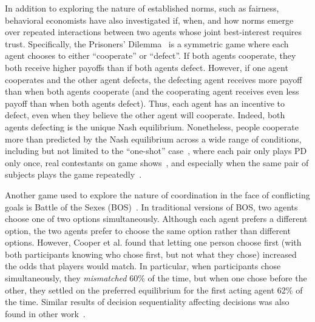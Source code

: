 In addition to exploring the nature of established norms, such as
fairness, behavioral economists have also investigated if, when, and
how norms emerge over repeated interactions between two agents whose
joint best-interest requires trust. Specifically, the Prisoners'
Dilemma~\cite{luce57} is a symmetric game where each agent chooses to
either ``cooperate'' or ``defect''. If both agents cooperate, they
both receive higher payoffs than if both agents defect. However, if
one agent cooperates and the other agent defects, the defecting agent
receives more payoff than when both agents cooperate (and the
cooperating agent receives even less payoff than when both agents
defect). Thus, each agent has an incentive to defect, even when they
believe the other agent will cooperate. Indeed, both agents defecting
is the unique Nash equilibrium. Nonetheless, people cooperate more
than predicted by the Nash equilibrium across a wide range of
conditions, including but not limited to the ``one-shot''
case~\cite{rapoport88}, where each pair only plays PD only once, real
contestants on game shows~\cite{list06}, and especially when the same
pair of subjects plays the game repeatedly~\cite{rand13,sally95}.

Another game used to explore the nature of coordination in the face of
conflicting goals is Battle of the Sexes (BOS)~\cite{luce57}. In
traditional versions of BOS, two agents choose one of two options
simultaneously. Although each agent prefers a different option, the
two agents prefer to choose the same option rather than different options.
However, Cooper et al.\cite{cooper94} found that letting
one person choose first (with both participants knowing who
chose first, but not what they chose) increased the odds
that players would match. In particular, when participants
chose simultaneously, they {\em mismatched} 60\% of the time,
but when one chose before the other, they settled on the 
preferred equilibrium for the first acting agent 62\% of the time.
Similar results of decision sequentiality affecting decisions
was also found in other work~\cite{rapoport97,ho96}.


